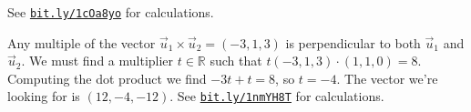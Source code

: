 \begin{Solution}{3.3}
See \href{http://bit.ly/1cOa8yo}{\texttt{bit.ly/1cOa8yo}} for calculations.
		
\end{Solution}
\begin{Solution}{3.4}
			Any multiple of the vector $\vec{u}_1 \times \vec{u}_2 = (-3,1,3)$
			is perpendicular to both $\vec{u}_1$ and 	$\vec{u}_2$.
			We must find a multiplier $t \in \mathbb{R}$ such that
			$t(-3,1,3) \cdot (1, 1, 0) = 8$.
			Computing the dot product we find $-3t + t = 8$, so $t=-4$.
			The vector we're looking for is $(12, -4, -12)$.
			See \href{http://bit.ly/1nmYH8T}{\texttt{bit.ly/1nmYH8T}} for calculations.
		
\end{Solution}
